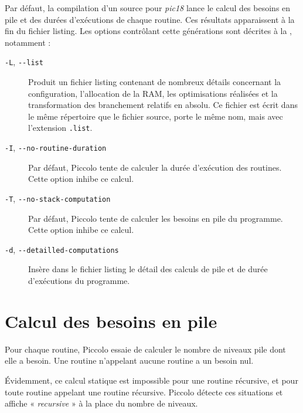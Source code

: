 


\thispagestyle{empty}

Par défaut, la compilation d'un source pour \emph{pic18} lance le calcul des besoins en pile et des durées d'exécutions de chaque routine. Ces résultats apparaissent à la fin du fichier listing. Les options contrôlant cette générations sont décrites à la , notamment :
\begin{description}

  \item[\texttt{-L}, \texttt{-{-}list}] Produit un fichier listing contenant de nombreux détails concernant la configuration, l’allocation de la RAM, les optimisations réalisées et la transformation des branchement relatifs en absolu. Ce fichier est écrit dans le même répertoire que le fichier source, porte le même nom, mais avec l’extension \texttt{.list}.

  \item[\texttt{-I}, \texttt{-{-}no-routine-duration}] Par défaut, Piccolo tente de calculer la durée d'exécution des routines. Cette option inhibe ce calcul.

  \item[\texttt{-T}, \texttt{-{-}no-stack-computation}] Par défaut, Piccolo tente de calculer les besoins en pile du programme. Cette option inhibe ce calcul.

  \item[\texttt{-d}, \texttt{-{-}detailled-computations}] Insère dans le fichier listing le détail des calculs de pile et de durée d'exécutions du programme.
\end{description}

\section{Calcul des besoins en pile}

Pour chaque routine, Piccolo essaie de calculer le nombre de niveaux pile dont elle a besoin. Une routine n'appelant aucune routine a un besoin nul.

Évidemment, ce calcul statique est impossible pour une routine récursive, et pour toute routine appelant une routine récursive. Piccolo détecte ces situations et affiche « \emph{recursive} » à la place du nombre de niveaux. 

